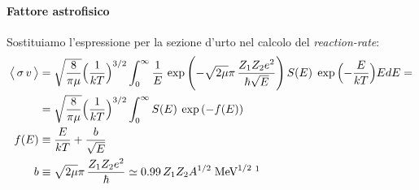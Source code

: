 \paragraph{Fattore astrofisico} 
Sostituiamo l'espressione per la sezione d'urto nel calcolo del \textit{reaction-rate}:
\begin{displaymath}
\begin{aligned}
\mean{\sigma\, v } &= \sqrt{\frac{8}{\pi\mu}} \ppc{\frac{1}{kT}}^{3/2} \int_0^\infty \frac{1}{E}\,\exp{\PPc{-\sqrt{2\mu}\pi\, \frac{Z_1Z_2 e^2}{\hbar \sqrt{E}}}}\, S(E) \; \exp{\ppc{-\frac{E}{kT}}} E dE = \\
&= \sqrt{\frac{8}{\pi\mu}} \ppc{\frac{1}{kT}}^{3/2} \int_0^\infty S(E) \: \exp{(-f(E))} \\
f(E) &\equiv \frac{E}{kT} + \frac{b}{\sqrt{E}}\\
b &\equiv \sqrt{2\mu}\pi\, \frac{Z_1Z_2 e^2}{\hbar} \simeq 0.99 \, Z_1 Z_2 A^{1/2} \unit{MeV}^{1/2}\; \footnotemark 
\end{aligned}
\end{displaymath}
